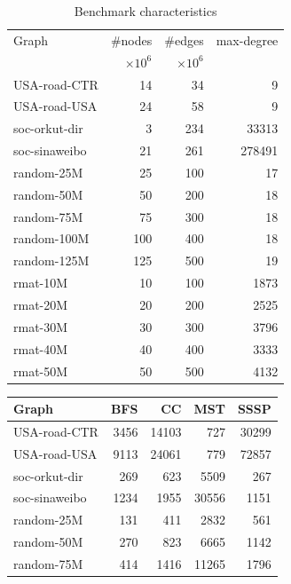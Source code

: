 \begin{figure}
\begin{minipage}{0.45\textwidth}
\begin{table}[H]
\centering
\footnotesize
\begin{tabular}{|l|r|r|r|}
\hline
Graph	& \#nodes	& \#edges	& max-degree	\\
	& $\times10^6$	& $\times10^6$	& \\
\hline
USA-road-CTR	& 14	& 34 	& 9    \\
USA-road-USA	& 24	& 58 	& 9    \\
soc-orkut-dir	& 3	& 234 	& 33313 \\
soc-sinaweibo	& 21	& 261 	& 278491 \\
random-25M	& 25	& 100 	& 17   \\
random-50M	& 50	& 200 	& 18   \\
random-75M	& 75	& 300 	& 18   \\
random-100M	& 100	& 400 	& 18   \\
random-125M	& 125	& 500 	& 19   \\
rmat-10M	& 10	& 100 	& 1873 \\
rmat-20M	& 20	& 200 	& 2525 \\
rmat-30M	& 30	& 300 	& 3796 \\
rmat-40M	& 40	& 400 	& 3333 \\
rmat-50M	& 50	& 500 	& 4132 \\
\hline
\end{tabular}
\caption{Benchmark characteristics}
\label{expt:chars}
\end{table}
\end{minipage}\hfill
\begin{minipage}{0.45\textwidth}
\begin{table}[H]
\centering
\footnotesize
\begin{tabular}{|l|r|r|r|r|}
\hline
Graph	 	& BFS	& CC	& MST	& SSSP \\
\hline
USA-road-CTR	& 3456	& 14103	& 727	& 30299 \\
USA-road-USA	& 9113	& 24061	& 779	& 72857 \\
soc-orkut-dir	& 269	& 623	& 5509	& 267   \\
soc-sinaweibo	& 1234	& 1955	& 30556	& 1151  \\
random-25M	& 131	& 411	& 2832	& 561   \\
random-50M	& 270	& 823	& 6665	& 1142  \\
random-75M	& 414	& 1416	& 11265	& 1796  \\

\end{tabular}
\end{table}
\end{minipage}
\end{figure}
